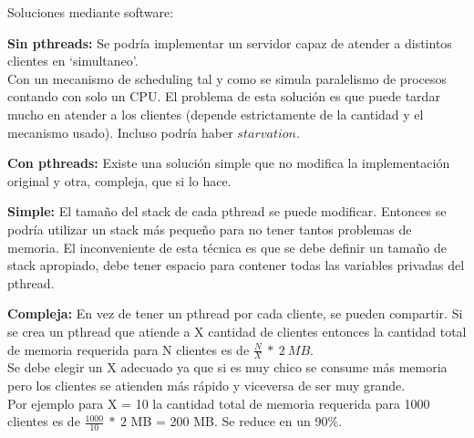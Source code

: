 Soluciones mediante software:
\begin{description}
 \item \textbf{Sin pthreads:} Se podría implementar un servidor capaz de atender a distintos clientes en \textquoteleft simultaneo\textquoteright.\\
 Con un mecanismo de scheduling tal y como se simula paralelismo de procesos contando con solo un CPU.  
 El problema de esta solución es que puede tardar mucho en atender a los clientes (depende estrictamente de la cantidad y el mecanismo usado).
 Incluso podría haber $starvation$.
 
 \item \textbf{Con pthreads:} Existe una solución simple que no modifica la implementación original y otra, compleja, que si lo hace.
 
    \begin{description} 
    \item \textbf{Simple:} El tamaño del stack de cada pthread se puede modificar. Entonces se podría utilizar un stack más pequeño para no tener
    tantos problemas de memoria. El inconveniente de esta técnica es que se debe definir un tamaño de stack apropiado, debe tener espacio para contener
    todas las variables privadas del pthread.
    
    \item \textbf{Compleja:} En vez de tener un pthread por cada cliente, se pueden compartir. Si se crea un pthread que atiende a X cantidad de clientes 
    entonces la cantidad total de memoria requerida para N clientes es de $\frac{N}{X}\ *\ 2\ MB$.\\
    Se debe elegir un X adecuado ya que si es muy chico se consume más memoria pero los clientes se atienden más rápido y viceversa de ser muy grande.\\
    Por ejemplo para X = 10 la cantidad total de memoria requerida para 1000 clientes es de $\frac{1000}{10}\ *\ 2$ MB = 200 MB. Se reduce en un 90\%.
    \end{description}
    
\end{description}